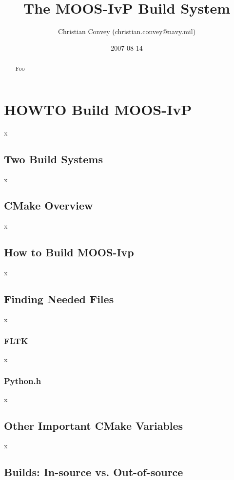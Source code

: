 \documentclass[letterpaper,10pt]{article}
\title{The MOOS-IvP Build System}
\author{Christian Convey (christian.convey@navy.mil)}
\date{2007-08-14}
\begin{document}
\maketitle

\tableofcontents

\parskip 7.2pt           %


\begin{abstract}
Foo
\end{abstract}

\section{HOWTO Build MOOS-IvP}
x

\subsection{Two Build Systems}
x

\subsection{CMake Overview}
x

\subsection{How to Build MOOS-Ivp}
x

\subsection{Finding Needed Files}
x

\subsubsection{FLTK}
x

\subsubsection{Python.h}
x

\subsection{Other Important CMake Variables}
x
\subsection{Builds: In-source vs. Out-of-source}
\end{document}
